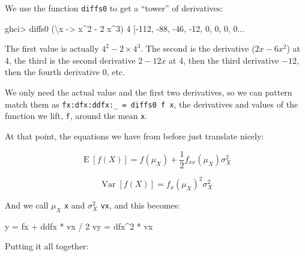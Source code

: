 \documentclass[]{article}
\newenvironment{Shaded}{}{}
\newcommand{\DecValTok}[1]{\textcolor[rgb]{0.25,0.63,0.44}{#1}}
\newcommand{\NormalTok}[1]{#1}
\newcommand{\OperatorTok}[1]{\textcolor[rgb]{0.40,0.40,0.40}{#1}}
\newcommand{\OtherTok}[1]{\textcolor[rgb]{0.00,0.44,0.13}{#1}}
\begin{document}
We use the function \texttt{diffs0} to get a ``tower'' of derivatives:

\begin{Shaded}
\begin{Highlighting}[]
\NormalTok{ghci}\OperatorTok{\textgreater{}}\NormalTok{ diffs0 (\textbackslash{}x }\OtherTok{{-}\textgreater{}}\NormalTok{ x}\OperatorTok{\^{}}\DecValTok{2} \OperatorTok{{-}} \DecValTok{2}\NormalTok{ x}\OperatorTok{\^{}}\DecValTok{3}\NormalTok{) }\DecValTok{4}
\NormalTok{[}\OperatorTok{{-}}\DecValTok{112}\NormalTok{, }\OperatorTok{{-}}\DecValTok{88}\NormalTok{, }\OperatorTok{{-}}\DecValTok{46}\NormalTok{, }\OperatorTok{{-}}\DecValTok{12}\NormalTok{, }\DecValTok{0}\NormalTok{, }\DecValTok{0}\NormalTok{, }\DecValTok{0}\NormalTok{, }\DecValTok{0}\OperatorTok{...}
\end{Highlighting}
\end{Shaded}

The first value is actually \(4^2 - 2 \times 4^3\). The second is the derivative
(\(2 x - 6x^2\)) at 4, the third is the second derivative \(2 - 12 x\) at 4,
then the third derivative \(-12\), then the fourth derivative \(0\), etc.

We only need the actual value and the first two derivatives, so we can pattern
match them as \texttt{fx:dfx:ddfx:\_\ =\ diffs0\ f\ x}, the derivatives and
values of the function we lift, \texttt{f}, around the mean \texttt{x}.

At that point, the equations we have from before just translate nicely:

\[
\operatorname{E}[f(X)] = f(\mu_X) + \frac{1}{2} f_{xx}(\mu_X) \sigma_X^2
\]

\[
\operatorname{Var}[f(X)] = f_x(\mu_X)^2 \sigma_X^2
\]

And we call \(\mu_X\) \texttt{x} and \(\sigma_X^2\) \texttt{vx}, and this
becomes:

\begin{Shaded}
\begin{Highlighting}[]
\NormalTok{y  }\OtherTok{=}\NormalTok{ fx }\OperatorTok{+}\NormalTok{ ddfx }\OperatorTok{*}\NormalTok{ vx }\OperatorTok{/} \DecValTok{2}
\NormalTok{vy }\OtherTok{=}\NormalTok{ dfx}\OperatorTok{\^{}}\DecValTok{2} \OperatorTok{*}\NormalTok{ vx}
\end{Highlighting}
\end{Shaded}

Putting it all together:
\end{document}
